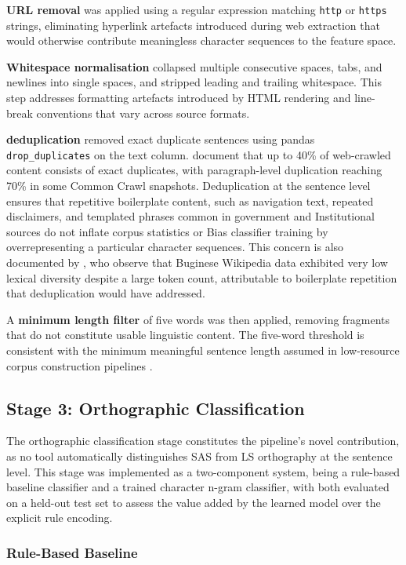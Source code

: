 \documentclass[11pt,a4paper]{article}
\begin{document}
\textbf{URL removal} was applied using a regular expression matching
\texttt{http} or \texttt{https} strings, eliminating hyperlink
artefacts introduced during web extraction that would otherwise
contribute meaningless character sequences to the feature space.

\textbf{Whitespace normalisation} collapsed multiple consecutive
spaces, tabs, and newlines into single spaces, and stripped leading
and trailing whitespace. This step addresses formatting artefacts
introduced by HTML rendering and line-break
conventions that vary across source formats.

\textbf{deduplication} removed exact duplicate sentences using
pandas \texttt{drop\_duplicates} on the text column.
\citet{tatariya2024good} document that up to 40\% of
web-crawled content consists of exact duplicates, with
paragraph-level duplication reaching 70\% in some Common Crawl
snapshots. Deduplication at the sentence level ensures that
repetitive boilerplate content, such as navigation text, repeated
disclaimers, and templated phrases common in government and
Institutional sources do not inflate corpus statistics or
Bias classifier training by overrepresenting a particular character
sequences. This concern is also documented by
\citet{cahyawijaya2023nusawrites}, who observe that Buginese
Wikipedia data exhibited very low lexical diversity despite a large
token count, attributable to boilerplate repetition that deduplication
would have addressed.

A \textbf{minimum length filter} of five words was then applied,
removing fragments that do not constitute usable linguistic content.
The five-word threshold is consistent with the minimum meaningful
sentence length assumed in low-resource corpus construction
pipelines \citep{de2024data}.

\subsection{Stage 3: Orthographic Classification}
The orthographic classification stage constitutes the pipeline's novel contribution, as no tool automatically distinguishes SAS from LS orthography at the sentence level. This stage was implemented as a two-component system, being a rule-based baseline classifier and a trained character n-gram classifier, with both evaluated on a held-out test set to assess the value added by the learned model over the explicit rule encoding.

\subsubsection{Rule-Based Baseline}
\label{sec:rulebased}
\end{document}
